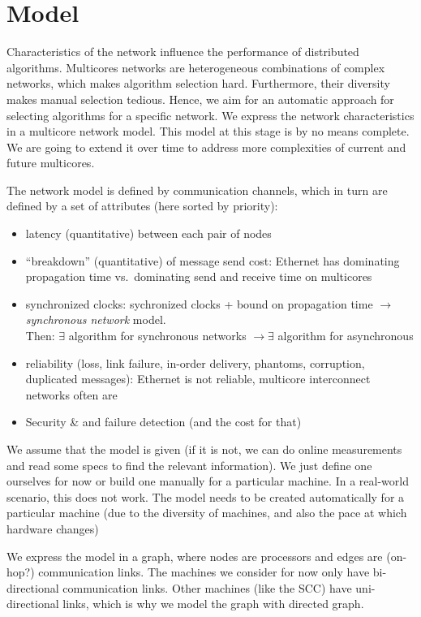 \documentclass{article}
\begin{document}
\section{Model}

Characteristics of the network influence the performance of
distributed algorithms. Multicores networks are heterogeneous
combinations of complex networks, which makes algorithm selection
hard. %
Furthermore, their diversity makes manual selection tedious. Hence, we
aim for an automatic approach for selecting algorithms for a specific
network. %
We express the network characteristics in a multicore network
model. This model at this stage is by no means complete. We are going to
extend it over time to address more complexities of current and future
multicores.

The network model is defined by communication channels, which in turn
are defined by a set of attributes (here sorted by priority):
\begin{itemize}
\item latency (quantitative) between each pair of nodes
\item ``breakdown'' (quantitative) of message send cost: Ethernet has
  dominating propagation time vs.\ dominating send and receive time on
  multicores
\item synchronized clocks: sychronized clocks + bound on propagation
  time $\rightarrow$ \emph{synchronous network} model. \\Then:
  $\exists$ algorithm for synchronous networks $\rightarrow
  \exists$ algorithm for asynchronous
\item reliability (loss, link failure, in-order delivery, phantoms,
  corruption, duplicated messages): Ethernet is not reliable,
  multicore interconnect networks often are
\item Security \& and failure detection (and the cost for that)
\end{itemize}

We assume that the model is given (if it is not, we can do online
measurements and read some specs to find the relevant information). We
just define one ourselves for now or build one manually for a
particular machine. In a real-world scenario, this does not work. The
model needs to be created automatically for a particular machine (due
to the diversity of machines, and also the pace at which hardware changes)

We express the model in a graph, where nodes are processors and edges
are (on-hop?) communication links. The machines we consider for now
only have bi-directional communication links. Other machines (like the
SCC) have uni-directional links, which is why we model the graph with
directed graph.
\end{document}
